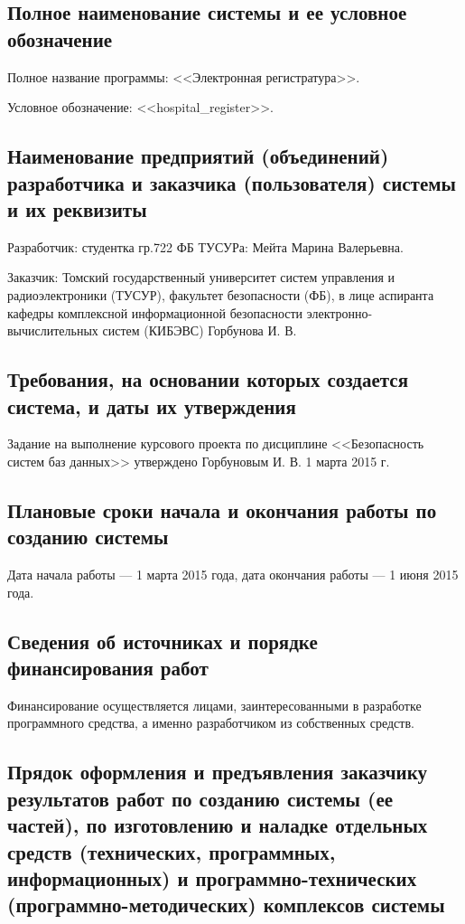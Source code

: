\subsection{Полное наименование системы и ее условное обозначение}

Полное название программы: <<Электронная регистратура>>.

Условное обозначение: <<hospital\_register>>.


\subsection{Наименование предприятий (объединений) разработчика и заказчика (пользователя) системы и их реквизиты}

Разработчик: студентка гр.722 ФБ ТУСУРа: Мейта Марина Валерьевна.

Заказчик: Томский государственный университет систем управления и радиоэлектроники (ТУСУР), факультет безопасности (ФБ), в лице аспиранта кафедры комплексной информационной безопасности электронно-вычислительных систем (КИБЭВС) Горбунова И. В.

\subsection{Требования, на основании которых создается система, и даты их утверждения}

Задание на выполнение курсового проекта по дисциплине <<Безопасность систем баз данных>> утверждено Горбуновым И. В. 1 марта 2015 г.

\subsection{Плановые сроки начала и окончания работы по созданию системы}

Дата начала работы --- 1 марта 2015 года, дата окончания работы --- 1 июня 2015 года. 

\subsection{Сведения об источниках и порядке финансирования работ}

Финансирование осуществляется лицами, заинтересованными в разработке программного средства, а именно разработчиком из собственных средств.

\subsection{Прядок оформления и предъявления заказчику результатов работ по созданию системы (ее частей), по изготовлению и наладке отдельных средств (технических, программных, информационных) и программно-технических (программно-методических) комплексов системы}

